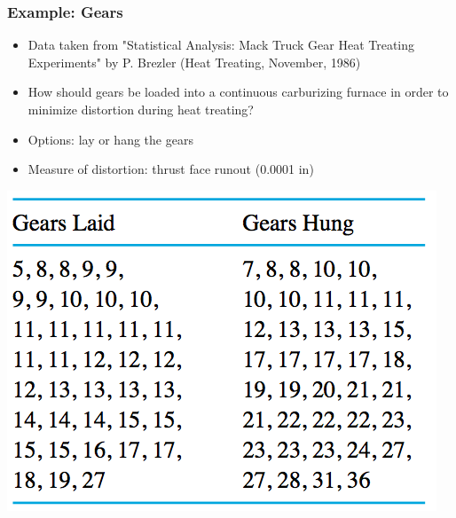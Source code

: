 \documentclass[handout]{beamer}\usepackage{graphicx, color}
\numberwithin{equation}{section}
\begin{document}
\begin{frame}
\frametitle{Example: Gears} \scriptsize
\begin{itemize}
\item Data taken from "Statistical Analysis: Mack Truck Gear Heat Treating Experiments" by P. Brezler (Heat Treating, November, 1986) \pause
\item How should gears be loaded into a continuous carburizing furnace in order to minimize distortion during heat treating? \pause
\item Options: lay or hang the gears \pause
\item Measure of distortion: thrust face runout (0.0001 in)
\end{itemize}

\begin{center}
 \includegraphics{../../fig/gearstable.png} 
\end{center}

\end{frame}
\end{document}

